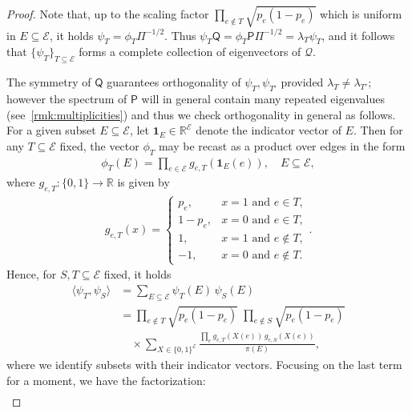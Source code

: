 \documentclass[11pt,a4paper]{article}
\begin{document}
\begin{proof}
    Note that, up to the scaling factor $\prod_{e\notin T} \sqrt{p_e(1-p_e)}$ which is uniform in $E\subseteq{\mathcal E}$, it holds $\psi_T = \phi_T \Pi^{-1/2}$. Thus $\psi_T \mathsf{Q}= \phi_T\mathsf{P}\Pi^{-1/2} = \lambda_T \psi_T$, and it follows that $\{\psi_T\}_{T\subseteq \mathcal{E}}$ forms a complete collection of eigenvectors of $\mathcal{Q}$. 

    The symmetry of $\mathsf{Q}$ guarantees orthogonality of $\psi_T, \psi_{T'}$ provided $\lambda_T\neq\lambda_{T'}$; however the spectrum of $\mathsf{P}$ will in general contain many repeated eigenvalues (see~\cref{rmk:multiplicities}) and thus we check orthogonality in general as follows. For a given subset $E\subseteq\mathcal{E}$, let $\mathbf{1}_E\in\mathbb{R}^{\mathcal{E}}$ denote the indicator vector of $E$. Then for any $T\subseteq\mathcal{E}$ fixed, the vector $\phi_T$ may be recast as a product over edges in the form
        \begin{align*}
            \phi_T(E)=\prod_{e\in\mathcal E}g_{e,T}(\mathbf{1}_E(e)),\quad E\subseteq\mathcal{E},
        \end{align*}
    where $g_{e,T}:\{0, 1\}\rightarrow\mathbb{R}$ is given by
        \begin{align*}
            g_{e,T}(x)=
            \begin{cases}
            p_e,&x=1\text{ and }e\in T,\\
            1-p_e,&x=0\text{ and }e\in T,\\
            1,&x=1\text{ and }e\notin T,\\
            -1,&x=0\text{ and }e\notin T.
            \end{cases}.
        \end{align*}
    Hence, for $S, T\subseteq\mathcal{E}$ fixed, it holds
        \begin{align*}
            \langle\psi_T,\psi_S\rangle
            &=\sum_{E\subseteq\mathcal E}\psi_T(E)\,\psi_S(E)\\
            &=\prod_{e\notin T}\sqrt{p_e(1-p_e)}
            \;\prod_{e\notin S}\sqrt{p_e(1-p_e)}\\
            &\quad\times \sum_{X\in\{0,1\}^{\mathcal E}}
            \frac{\prod_{e}g_{e,T}(X(e))\,g_{e,S}(X(e))}{\pi(E)},
        \end{align*}
    where we identify subsets with their indicator vectors. Focusing on the last term for a moment, we have the factorization:
        \begin{align*}

\end{align*}
\end{proof}
\end{document}
